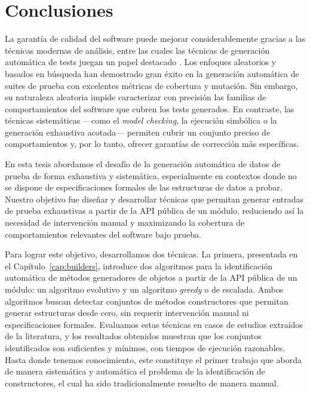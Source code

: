 \chapter{Conclusiones}
\label{cap:conclutions}

La garantía de calidad del software puede mejorar considerablemente gracias a las técnicas modernas de análisis, 
entre las cuales las técnicas de generación automática de tests juegan un papel destacado \cite{Cadar08, Luckow14, Fraser11, Pacheco07, Ma15, Godefroid05, Marinov01, Boyapati02,Godefroid12}. 
Los enfoques aleatorios y basados en búsqueda han demostrado gran éxito en la generación automática de suites de prueba con excelentes métricas de cobertura y mutación. 
Sin embargo, su naturaleza aleatoria impide caracterizar con precisión las familias de comportamientos del software que cubren los tests generados. 
En contraste, las técnicas sistemáticas —como el \emph{model checking}, la ejecución simbólica o la generación exhaustiva acotada— permiten cubrir un conjunto preciso de comportamientos 
y, por lo tanto, ofrecer garantías de corrección más específicas.

En esta tesis abordamos el desafío de la generación automática de datos de prueba de forma exhaustiva y sistemática, 
especialmente en contextos donde no se dispone de especificaciones formales de las estructuras de datos a probar. 
Nuestro objetivo fue diseñar y desarrollar técnicas que permitan generar entradas de prueba exhaustivas a partir de la API pública de un módulo, 
reduciendo así la necesidad de intervención manual y maximizando la cobertura de comportamientos relevantes del software bajo prueba.

Para lograr este objetivo, desarrollamos dos técnicas. La primera, presentada en el Capítulo~\ref{cap:builders}, 
introduce dos algoritmos para la identificación automática de métodos generadores de objetos a partir de la API pública de un módulo: un algoritmo evolutivo y un algoritmo \emph{greedy} o de escalada.
Ambos algoritmos buscan detectar conjuntos de métodos constructores que permitan generar estructuras desde cero, 
sin requerir intervención manual ni especificaciones formales. 
Evaluamos estas técnicas en casos de estudios extraídos de la literatura, 
y los resultados obtenidos muestran que los conjuntos identificados son suficientes y mínimos, con tiempos de ejecución razonables. 
Hasta donde tenemos conocimiento, este constituye el primer trabajo que aborda de manera sistemática y automática el problema de la identificación de constructores, el cual ha sido tradicionalmente resuelto de manera manual.

